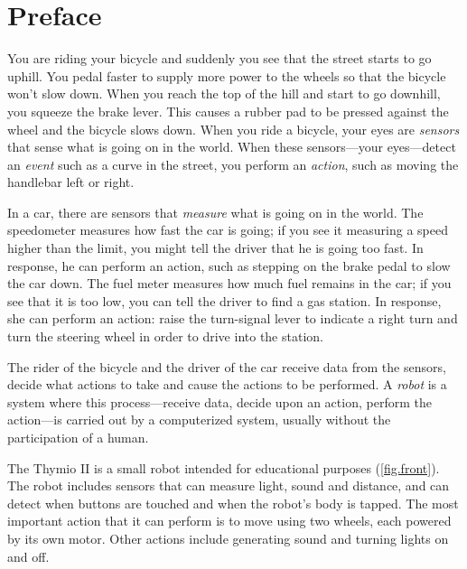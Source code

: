 
\chapter*{Preface}


You are riding your bicycle and suddenly you see that the street starts
to go uphill. You pedal faster to supply more power to the wheels so
that the bicycle won't slow down. When you reach the top of the hill and
start to go downhill, you squeeze the brake lever. This causes a rubber
pad to be pressed against the wheel and the bicycle slows down. When you
ride a bicycle, your eyes are \textit{sensors} that sense what is going
on in the world. When these sensors---your eyes---detect an
\textit{event} such as a curve in the street, you perform an
\textit{action}, such as moving the handlebar left or right.

In a car, there are sensors that \textit{measure} what is going on in
the world. The speedometer measures how fast the car is going; if you
see it measuring a speed higher than the limit, you might tell the
driver that he is going too fast. In response, he can perform an action,
such as stepping on the brake pedal to slow the car down. The fuel meter
measures how much fuel remains in the car; if you see that it is too
low, you can tell the driver to find a gas station. In response, she can
perform an action: raise the turn-signal lever to indicate a right turn
and turn the steering wheel in order to drive into the station.

The rider of the bicycle and the driver of the car receive data from the
sensors, decide what actions to take and cause the actions to be
performed. A \textit{robot} is a system where this process---receive
data, decide upon an action, perform the action---is carried out by a
computerized system, usually without the participation of a human.


The Thymio II is a small robot intended for educational purposes
(\cref{fig.front}). The robot includes sensors that can measure light,
sound and distance, and can detect when buttons are touched and when the
robot's body is tapped. The most important action that it can perform is
to move using two wheels, each powered by its own motor. Other actions
include generating sound and turning lights on and off.

